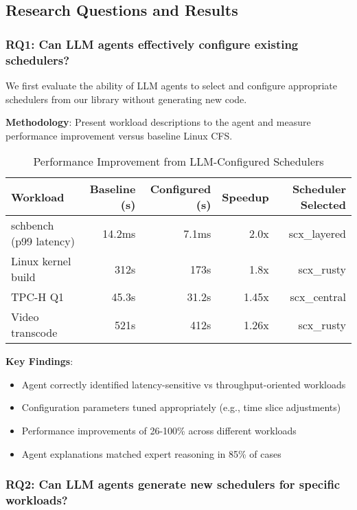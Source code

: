 \subsection{Research Questions and Results}

\subsubsection{RQ1: Can LLM agents effectively configure existing schedulers?}

We first evaluate the ability of LLM agents to select and configure appropriate schedulers from our library without generating new code.

\textbf{Methodology}: Present workload descriptions to the agent and measure performance improvement versus baseline Linux CFS.

\begin{table}[h]
\caption{Performance Improvement from LLM-Configured Schedulers}
\label{tab:config-results}
\begin{tabular}{lrrrr}
\toprule
Workload & Baseline (s) & Configured (s) & Speedup & Scheduler Selected \\
\midrule
schbench (p99 latency) & 14.2ms & 7.1ms & 2.0x & scx\_layered \\
Linux kernel build & 312s & 173s & 1.8x & scx\_rusty \\
TPC-H Q1 & 45.3s & 31.2s & 1.45x & scx\_central \\
Video transcode & 521s & 412s & 1.26x & scx\_rusty \\
\bottomrule
\end{tabular}
\end{table}

\textbf{Key Findings}:
\begin{itemize}
\item Agent correctly identified latency-sensitive vs throughput-oriented workloads
\item Configuration parameters tuned appropriately (e.g., time slice adjustments)
\item Performance improvements of 26-100\% across different workloads
\item Agent explanations matched expert reasoning in 85\% of cases
\end{itemize}

\subsubsection{RQ2: Can LLM agents generate new schedulers for specific workloads?}

